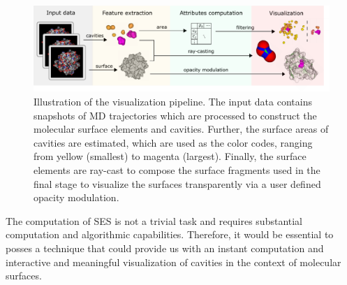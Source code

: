 \begin{figure}[tb]
  \centering
  \includegraphics[width=\textwidth]{image/overview.pdf}
  \caption{Illustration of the visualization pipeline. The input data contains snapshots of MD trajectories which are processed to construct the molecular surface elements and cavities. Further, the surface areas of cavities are estimated, which are used as the color codes, ranging from yellow (smallest) to magenta (largest). Finally, the surface elements are ray-cast to compose the surface fragments used in the final stage to visualize the surfaces transparently via a user defined opacity modulation.}
	\label{fig:overview}
\end{figure}

The computation of SES is not a trivial task and requires substantial computation and algorithmic capabilities. 
Therefore, it would be essential to posses a technique that could provide us with an instant computation and interactive and meaningful visualization of cavities in the context of molecular surfaces.

